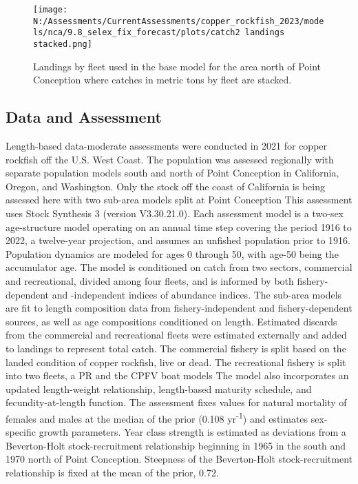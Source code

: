 \documentclass[11pt,
  english,
  letterpaper,
]{article}
\begin{document}
\begin{figure}
\centering
\texttt{[image: N:/Assessments/CurrentAssessments/copper\_rockfish\_2023/models/nca/9.8\_selex\_fix\_forecast/plots/catch2 landings stacked.png]}
\caption{Landings by fleet used in the base model for the area north of Point Conception where catches in metric tons by fleet are stacked.\label{fig:es-north-catch}}
\end{figure}

\pagebreak

\hypertarget{data-and-assessment}{%
\subsection*{Data and Assessment}\label{data-and-assessment}}

Length-based data-moderate assessments were conducted in 2021 for copper rockfish off the U.S. West Coast. The population was assessed regionally with separate population models south and north of Point Conception in California, Oregon, and Washington. Only the stock off the coast of California is being assessed here with two sub-area models split at Point Conception This assessment uses Stock Synthesis 3 (version V3.30.21.0). Each assessment model is a two-sex age-structure model operating on an annual time step covering the period 1916 to 2022, a twelve-year projection, and assumes an unfished population prior to 1916. Population dynamics are modeled for ages 0 through 50, with age-50 being the accumulator age. The model is conditioned on catch from two sectors, commercial and recreational, divided among four fleets, and is informed by both fishery-dependent and -independent indices of abundance indices. The sub-area models are fit to length composition data from fishery-independent and fishery-dependent sources, as well as age compositions conditioned on length. Estimated discards from the commercial and recreational fleets were estimated externally and added to landings to represent total catch. The commercial fishery is split based on the landed condition of copper rockfish, live or dead. The recreational fishery is split into two fleets, a PR and the CPFV boat models The model also incorporates an updated length-weight relationship, length-based maturity schedule, and fecundity-at-length function. The assessment fixes values for natural mortality of females and males at the median of the prior (0.108 yr\textsuperscript{-1}) and estimates sex-specific growth parameters. Year class strength is estimated as deviations from a Beverton-Holt stock-recruitment relationship beginning in 1965 in the south and 1970 north of Point Conception. Steepness of the Beverton-Holt stock-recruitment relationship is fixed at the mean of the prior, 0.72.
\end{document}
